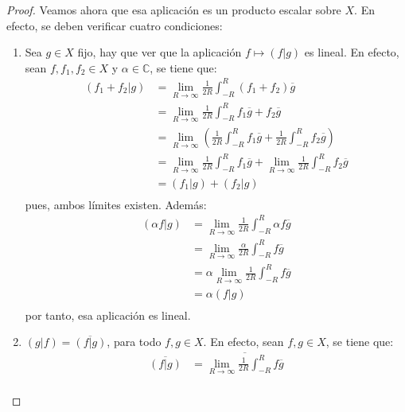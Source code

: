 \documentclass[12pt]{report}
\newcounter{it}
\theoremstyle{largebreak}
\newcommand\pint[2]{\ensuremath{\left(#1\big|#2\right)}}
\newcommand\conj[1]{\ensuremath{\overline{#1}}}
\begin{document}
\begin{proof}
        Veamos ahora que esa aplicación es un producto escalar sobre $X$. En efecto, se deben verificar cuatro condiciones:
        \begin{enumerate}
            \item Sea $g\in X$ fijo, hay que ver que la aplicación $f\mapsto \pint{f}{g}$ es lineal. En efecto, sean $f,f_1,f_2\in X$ y $\alpha\in \mathbb{C}$, se tiene que:
            \begin{equation*}
                \begin{split}
                    \pint{f_1+f_2}{g}&=\lim_{R\rightarrow\infty }\frac{1}{2R}\int_{-R}^{R}(f_1+f_2)\conj{g}\\
                    &=\lim_{R\rightarrow\infty }\frac{1}{2R}\int_{-R}^{R}f_1\conj{g}+f_2\conj{g}\\
                    &=\lim_{R\rightarrow\infty }\left(\frac{1}{2R}\int_{-R}^{R}f_1\conj{g}+\frac{1}{2R}\int_{-R}^{R}f_2\conj{g}\right)\\
                    &=\lim_{R\rightarrow\infty}\frac{1}{2R}\int_{-R}^{R}f_1\conj{g}+\lim_{R\rightarrow\infty}\frac{1}{2R}\int_{-R}^{R}f_2\conj{g}\\
                    &=\pint{f_1}{g}+\pint{f_2}{g}\\
                \end{split}
            \end{equation*}
            pues, ambos límites existen. Además:
            \begin{equation*}
                \begin{split}
                    \pint{\alpha f}{g}&=\lim_{R\rightarrow\infty }\frac{1}{2R}\int_{-R}^{R}\alpha f\conj{g}\\
                    &=\lim_{R\rightarrow\infty }\frac{\alpha}{2R}\int_{-R}^{R} f\conj{g}\\
                    &=\alpha\lim_{R\rightarrow\infty }\frac{1}{2R}\int_{-R}^{R} f\conj{g}\\
                    &=\alpha\pint{f}{g}\\
                \end{split}
            \end{equation*}
            por tanto, esa aplicación es lineal.
            \item $\pint{g}{f}=\conj{\pint{f}{g}}$, para todo $f,g\in X$. En efecto, sean $f,g\in X$, se tiene que:
            \begin{equation*}
                \begin{split}
                    \conj{\pint{f}{g}}&=\conj{\lim_{R\rightarrow\infty }\frac{1}{2R}\int_{-R}^{R}f\conj{g}} \\

\end{split}
\end{equation*}
\end{enumerate}
\end{proof}
\end{document}
